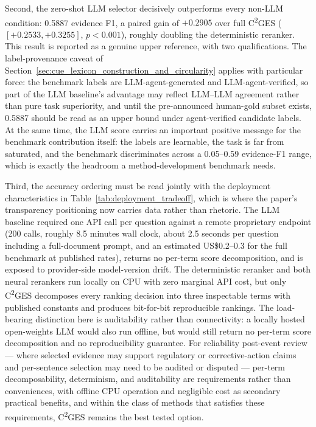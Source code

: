 \documentclass{ieeeaccess}
\begin{document}
Second, the zero-shot LLM selector decisively outperforms every non-LLM condition: 0.5887 evidence F1, a paired gain of \(+0.2905\) over full C\textsuperscript{2}GES (\([+0.2533, +0.3255]\), \(p<0.001\)), roughly doubling the deterministic reranker. This result is reported as a genuine upper reference, with two qualifications. The label-provenance caveat of Section~\ref{sec:cue_lexicon_construction_and_circularity} applies with particular force: the benchmark labels are LLM-agent-generated and LLM-agent-verified, so part of the LLM baseline's advantage may reflect LLM--LLM agreement rather than pure task superiority, and until the pre-announced human-gold subset exists, 0.5887 should be read as an upper bound under agent-verified candidate labels. At the same time, the LLM score carries an important positive message for the benchmark contribution itself: the labels are learnable, the task is far from saturated, and the benchmark discriminates across a 0.05--0.59 evidence-F1 range, which is exactly the headroom a method-development benchmark needs.

Third, the accuracy ordering must be read jointly with the deployment characteristics in Table~\ref{tab:deployment_tradeoff}, which is where the paper's transparency positioning now carries data rather than rhetoric. The LLM baseline required one API call per question against a remote proprietary endpoint (200 calls, roughly 8.5 minutes wall clock, about 2.5 seconds per question including a full-document prompt, and an estimated US\$0.2--0.3 for the full benchmark at published rates), returns no per-term score decomposition, and is exposed to provider-side model-version drift. The deterministic reranker and both neural rerankers run locally on CPU with zero marginal API cost, but only C\textsuperscript{2}GES decomposes every ranking decision into three inspectable terms with published constants and produces bit-for-bit reproducible rankings. The load-bearing distinction here is auditability rather than connectivity: a locally hosted open-weights LLM would also run offline, but would still return no per-term score decomposition and no reproducibility guarantee. For reliability post-event review --- where selected evidence may support regulatory or corrective-action claims and per-sentence selection may need to be audited or disputed --- per-term decomposability, determinism, and auditability are requirements rather than conveniences, with offline CPU operation and negligible cost as secondary practical benefits, and within the class of methods that satisfies these requirements, C\textsuperscript{2}GES remains the best tested option.
\end{document}
